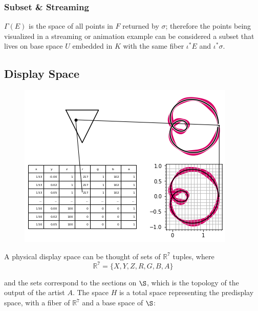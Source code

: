 \documentclass[../intro.tex]{subfiles}
\begin{document}

\subsubsection{Subset \& Streaming}
$\Gamma(E)$ is the space of all points in $F$ returned by $\sigma$; therefore the points being visualized in a streaming or animation example can be considered a subset that lives on base space $U$ embedded in $K$ with the same fiber $\iota^*E$ and $\iota^*\sigma$.   



\subsection{Display Space}
\label{sec:display}
\begin{figure}[h]
    \includegraphics[width=.4\linewidth]{figures/sections/math/render.png}
    \caption{}
    \label{fig:render}
\end{figure}

A physical display space can be thought of sets of $\mathbb{R}^{7}$ tuples, where 
\begin{equation}
    \mathbb{R}^{7} = \{X, Y, Z, R, G, B, A\}
\end{equation}

and the sets correspond to the sections on $\S$, which is the topology of the output of the artist $A$. The space $H$ is a total space representing the predisplay space, with a fiber of $\mathbb{R}^7$ and a base space of $\S$:
\end{document}
